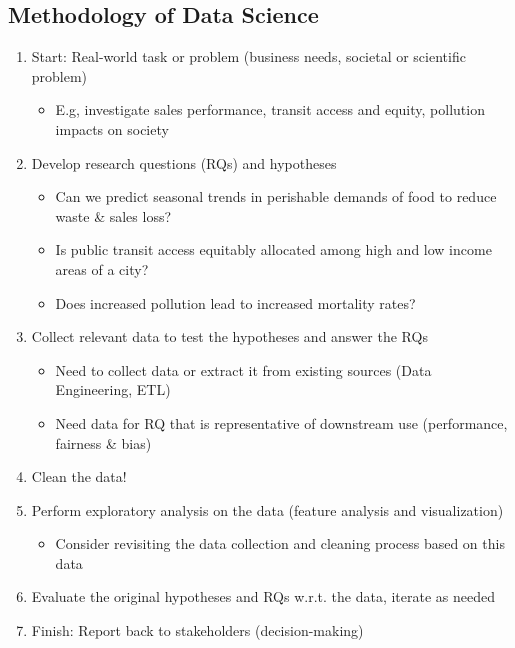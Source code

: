 \documentclass[11pt]{article}
\theoremstyle{definition}
\begin{document}
\subsection{Methodology of Data Science}
\begin{enumerate}
  \item Start: Real-world task or problem (business needs, societal or scientific problem)
  \begin{itemize}
    \item E.g, investigate sales performance, transit access and equity, pollution impacts on society
  \end{itemize}
  \item Develop research questions (RQs) and hypotheses
  \begin{itemize}
    \item Can we predict seasonal trends in perishable demands of food to reduce waste \& sales loss?
    \item Is public transit access equitably allocated among high and low income areas of a city?
    \item Does increased pollution lead to increased mortality rates?
  \end{itemize}
  \item Collect relevant data to test the hypotheses and answer the RQs
  \begin{itemize}
    \item Need to collect data or extract it from existing sources (Data Engineering, ETL)
    \item Need data for RQ that is representative of downstream use (performance, fairness \& bias)
  \end{itemize}
  \item Clean the data!
  \item Perform exploratory analysis on the data (feature analysis and visualization)
  \begin{itemize}
    \item Consider revisiting the data collection and cleaning process based on this data
  \end{itemize}
  \item Evaluate the original hypotheses and RQs w.r.t. the data, iterate as needed
  \item Finish: Report back to stakeholders (decision-making)
\end{enumerate}
\end{document}
